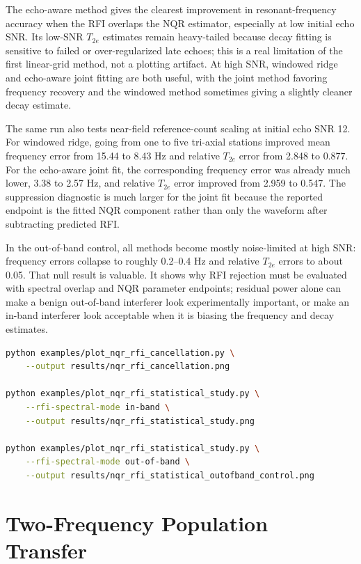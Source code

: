 \documentclass[11pt,oneside]{report}
\begin{document}
The echo-aware method gives the clearest improvement in resonant-frequency
accuracy when the RFI overlaps the NQR estimator, especially at low initial
echo SNR. Its low-SNR \(T_{2e}\) estimates remain heavy-tailed because decay
fitting is sensitive to failed or over-regularized late echoes; this is a real
limitation of the first linear-grid method, not a plotting artifact. At high
SNR, windowed ridge and echo-aware joint fitting are both useful, with the joint
method favoring frequency recovery and the windowed method sometimes giving a
slightly cleaner decay estimate.

The same run also tests near-field reference-count scaling at initial echo
SNR 12. For windowed ridge, going from one to five tri-axial stations improved
mean frequency error from 15.44 to 8.43 Hz and relative \(T_{2e}\) error from
2.848 to 0.877. For the echo-aware joint fit, the corresponding frequency
error was already much lower, 3.38 to 2.57 Hz, and relative \(T_{2e}\) error
improved from 2.959 to 0.547. The suppression diagnostic is much larger for the
joint fit because the reported endpoint is the fitted NQR component rather than
only the waveform after subtracting predicted RFI.

In the out-of-band control, all methods become mostly noise-limited at high
SNR: frequency errors collapse to roughly 0.2--0.4 Hz and relative \(T_{2e}\)
errors to about 0.05. That null result is valuable. It shows why RFI rejection
must be evaluated with spectral overlap and NQR parameter endpoints; residual
power alone can make a benign out-of-band interferer look experimentally
important, or make an in-band interferer look acceptable when it is biasing the
frequency and decay estimates.

\begin{lstlisting}[language=bash]
python examples/plot_nqr_rfi_cancellation.py \
    --output results/nqr_rfi_cancellation.png

python examples/plot_nqr_rfi_statistical_study.py \
    --rfi-spectral-mode in-band \
    --output results/nqr_rfi_statistical_study.png

python examples/plot_nqr_rfi_statistical_study.py \
    --rfi-spectral-mode out-of-band \
    --output results/nqr_rfi_statistical_outofband_control.png
\end{lstlisting}

\section{Two-Frequency Population Transfer}
\end{document}
